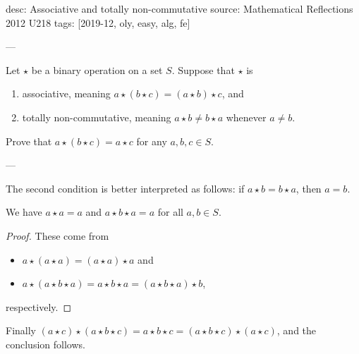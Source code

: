 desc: Associative and totally non-commutative
source: Mathematical Reflections 2012 U218
tags: [2019-12, oly, easy, alg, fe]

---

Let $\star$ be a binary operation on a set $S$. Suppose that $\star$ is
\begin{enumerate}[label=(\roman*),itemsep=0em]
    \item associative, meaning $a\star(b\star c)=(a\star b)\star c$, and
    \item totally non-commutative, meaning $a\star b\ne b\star a$ whenever $a\ne b$.
\end{enumerate}
Prove that $a\star(b\star c)=a\star c$ for any $a,b,c\in S$.

---

The second condition is better interpreted as follows: if $a\star b=b\star a$, then $a=b$.
\begin{claim*}
    We have $a\star a=a$ and $a\star b\star a=a$ for all $a,b\in S$.
\end{claim*}
\begin{proof}
    These come from
    \begin{itemize}[itemsep=0em]
        \item $a\star(a\star a)=(a\star a)\star a$ and
        \item $a\star(a\star b\star a)=a\star b\star a=(a\star b\star a)\star b$,
    \end{itemize}
    respectively.
\end{proof}

Finally $(a\star c)\star(a\star b\star c)=a\star b\star c=(a\star b\star c)\star(a\star c)$, and the conclusion follows.
